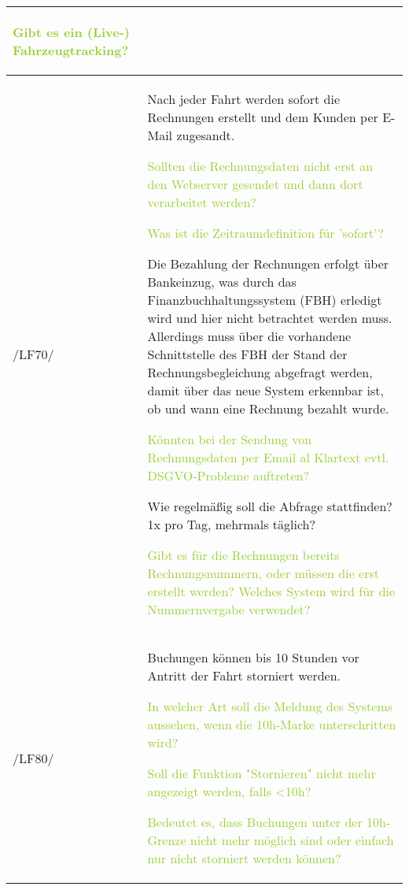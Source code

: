 \begin{tabular}[ht] {l | p{13cm}}
    \textcolor{YellowGreen}{Gibt es ein (Live-) Fahrzeugtracking?}
    
    \textcolor{NavyBlue}{}
    \\
    \hline
    /LF70/ & Nach jeder Fahrt werden sofort die Rechnungen erstellt und dem Kunden per  
    E-Mail zugesandt. 
    
    \textcolor{YellowGreen}{Sollten die Rechnungsdaten nicht erst an den Webserver gesendet und dann dort verarbeitet werden?}

    \textcolor{NavyBlue}{}

    \textcolor{YellowGreen}{Was ist die Zeitraumdefinition für 'sofort'?}

    \textcolor{NavyBlue}{}

    Die Bezahlung der Rechnungen erfolgt über Bankeinzug, was durch das Finanzbuchhaltungssystem (FBH) erledigt wird und hier nicht betrachtet werden muss. Allerdings muss über die vorhandene Schnittstelle des FBH der Stand der Rechnungsbegleichung abgefragt werden, damit über das neue System erkennbar ist, ob und wann eine Rechnung bezahlt wurde. 
    
    \textcolor{YellowGreen}{Könnten bei der Sendung von Rechnungsdaten per Email al Klartext evtl. DSGVO-Probleme auftreten?}

    \textcolor{NavyBlue}{}

    \textcolor{YellowGreen}{}Wie regelmäßig soll die Abfrage stattfinden? 1x pro Tag, mehrmals täglich?

    \textcolor{NavyBlue}{}

    \textcolor{YellowGreen}{Gibt es für die Rechnungen bereits Rechnungsnummern, oder müssen die erst erstellt werden? Welches System wird für die Nummernvergabe verwendet?}
    
    \textcolor{NavyBlue}{}
    \\
    \hline
    /LF80/ & Buchungen können bis 10 Stunden vor Antritt der Fahrt storniert werden. 
    
    \textcolor{YellowGreen}{In welcher Art soll die Meldung des Systems aussehen, wenn die 10h-Marke unterschritten wird?}

    \textcolor{NavyBlue}{}

    \textcolor{YellowGreen}{Soll die Funktion "Stornieren" nicht mehr angezeigt werden, falls <10h?}

    \textcolor{NavyBlue}{}

    \textcolor{YellowGreen}{Bedeutet es, dass Buchungen unter der 10h-Grenze nicht mehr möglich sind oder einfach nur nicht storniert werden können?}


\end{tabular}

